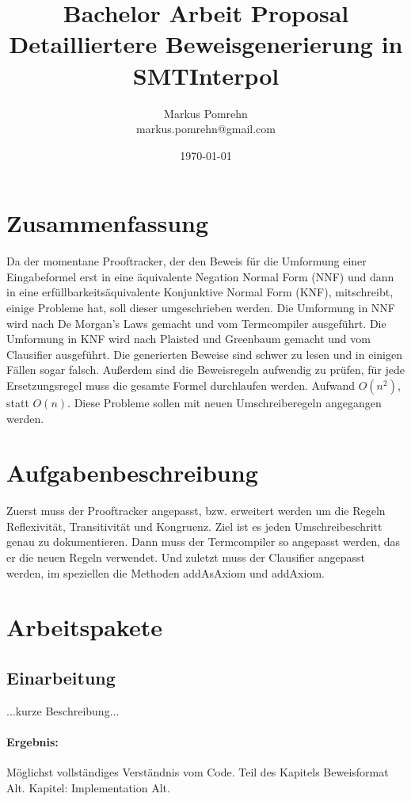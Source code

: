 \documentclass[a4paper]{article}
\title{Bachelor Arbeit Proposal\\
  Detailliertere Beweisgenerierung in SMTInterpol
}
\author{Markus Pomrehn\\{markus.pomrehn@gmail.com}}
\date{\today}
\begin{document}
\maketitle

\section{Zusammenfassung}

Da der momentane Prooftracker, der den Beweis für die Umformung einer Eingabeformel erst in eine äquivalente Negation Normal Form (NNF) und dann in eine erfüllbarkeitsäquivalente Konjunktive Normal Form (KNF), mitschreibt, einige Probleme hat, soll dieser umgeschrieben werden.
Die Umformung in NNF wird nach De Morgan's Laws gemacht und vom Termcompiler ausgeführt.
Die Umformung in KNF wird nach Plaisted und Greenbaum gemacht und vom Clausifier ausgeführt.
Die generierten Beweise sind schwer zu lesen und in einigen Fällen sogar falsch.
Außerdem sind die Beweisregeln aufwendig zu prüfen, für jede Ersetzungsregel muss die gesamte Formel durchlaufen werden.
Aufwand $O(n^2)$, statt $O(n)$. Diese Probleme sollen mit neuen Umschreiberegeln angegangen werden.

\section{Aufgabenbeschreibung}

Zuerst muss der Prooftracker angepasst, bzw. erweitert werden um die Regeln Reflexivität, Transitivität und Kongruenz.
Ziel ist es jeden Umschreibeschritt genau zu dokumentieren.
Dann muss der Termcompiler so angepasst werden, das er die neuen Regeln verwendet.
Und zuletzt muss der Clausifier angepasst werden, im speziellen die Methoden addAsAxiom und addAxiom.

\section{Arbeitspakete}

\subsection{Einarbeitung}

...kurze Beschreibung...

\paragraph{Ergebnis:}
Möglichst vollständiges Verständnis vom Code.
Teil des Kapitels Beweisformat Alt.
Kapitel: Implementation Alt.
\end{document}

